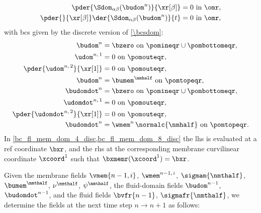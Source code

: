 \begin{align}
    \label{eq_domain_fluid_rigid_disc}
    \pder{\Sdom_{\alpha \beta}(\budom^n)}{\xr[\beta]}          & = 0 \text{ in } \omr, \\
    \label{eq_domain_fluid_rigid_disc_dot}
    \pder{}{\xr[\beta]}\der{\Sdom_{\alpha \beta}(\budom^n)}{t} & = 0 \text{ in } \omr,
\end{align}
with \acp{bc} given by the discrete version of \cref{\bcsdom}:
\begin{align}
    \label{bc_fl_mem_dom_1_disc}
    \budom^n                          & = \bzero \text{ on } \pomineqr \cup \pombottomeqr,     \\
    \label{bc_fl_mem_dom_2_disc}
    \udom^{n, \, 1}                   & = 0 \text{ on } \pomouteqr,                            \\
    \label{bc_fl_mem_dom_3_disc}
    \pder{\udom^{n, \, 2}}{\xr[1]}    & = 0 \text{ on } \pomouteqr,                            \\
    \label{bc_fl_mem_dom_4_disc}
    \budom^n                          & = \bumem^{\nmhalf} \text{ on } \pomtopeqr,             \\
    \label{bc_fl_mem_dom_5_disc}
    \budomdot^n                       & = \bzero \text{ on } \pomineqr \cup \pombottomeqr,     \\
    \label{bc_fl_mem_dom_6_disc}
    \udomdot^{n, \, 1}                & = 0 \text{ on } \pomouteqr,                            \\
    \label{bc_fl_mem_dom_7_disc}
    \pder{\udomdot^{n, \, 2}}{\xr[1]} & = 0 \text{ on } \pomouteqr,                            \\
    \label{bc_fl_mem_dom_8_disc}
    \budomdot^n                       & = \wmem^n \, \normalc{\nmhalf} \text{ on } \pomtopeqr.
\end{align}
In \cref{bc_fl_mem_dom_4_disc,bc_fl_mem_dom_8_disc} the \ac{lhs} is evaluated at a \ac{ref} coordinate $\bxr$, and the \ac{rhs} at the corresponding membrane curvilinear coordinate $\xcoord^1$ such that $\bxmemr(\xcoord^1) = \bxr$.

Given the membrane fields $\vmem{n-1, i}$, $\wmem^{n-1, \, i}$, $\sigmam{\nmthalf}$, $\bumem^{\nmthalf}$, $\nu^{\nmthalf}$, $\psi^{\nmthalf}$, the fluid-domain fields $\budom^{n-1}$, $\budomdot^{n-1}$, and the fluid fields $\bvfr{n-1}$, $\sigmafr{\nmthalf}$, we determine the fields at the next time step $n \rightarrow n+1$ as follows:



